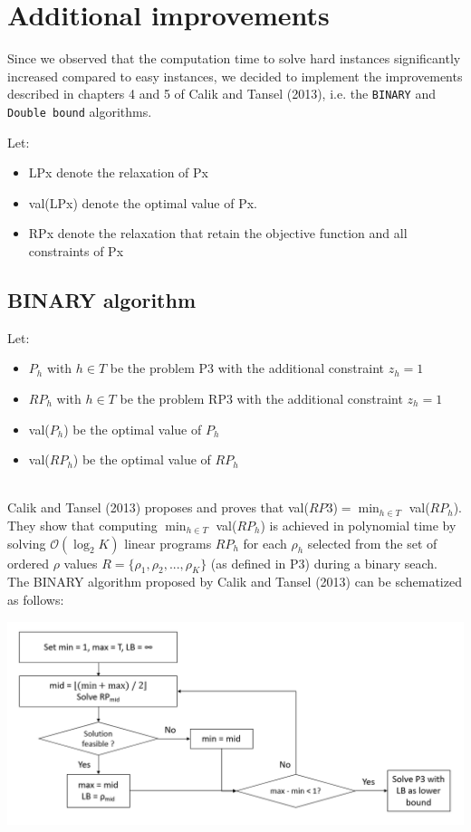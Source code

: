 \newpage
\chapter{Additional improvements}

Since we observed that the computation time to solve hard instances significantly increased compared to easy instances, we decided to implement the improvements described in chapters 4 and 5 of Calik and Tansel (2013), i.e. the \verb+BINARY+ and \verb+Double bound+ algorithms.

Let: 
\begin{itemize}
	\item LPx denote the relaxation of Px
	\item val(LPx) denote the optimal value of Px.
	\item RPx denote the relaxation that retain the objective function and all constraints of Px
\end{itemize} 

\section{BINARY algorithm}

Let:
\begin{itemize}
	\item $P_h$ with $h \in T$ be the problem P3 with the additional constraint $z_h = 1$
	\item $RP_h$ with $h \in T$ be the problem RP3 with the additional constraint $z_h = 1$
	\item val($P_h$) be the optimal value of $P_h$
	\item val($RP_h$) be the optimal value of $RP_h$
\end{itemize}\ \\

Calik and Tansel (2013) proposes and proves that val($RP3$)$ = \min_{h \in T}$ val($RP_h$). They show that computing $\min_{h \in T}$ val($RP_h$) is achieved in polynomial time by solving $\mathcal{O}\left( \log_2 K \right)$ linear programs $RP_h$ for each $\rho_h$ selected from the set of ordered $\rho$ values $R = \lbrace \rho_1, \rho_2, ..., \rho_K \rbrace$ (as defined in P3) during a binary seach.\\
The BINARY algorithm proposed by Calik and Tansel (2013) can be schematized as follows:
\begin{center}
	\includegraphics[width=\textwidth]{../imgs/BINARY.png}
\end{center}


